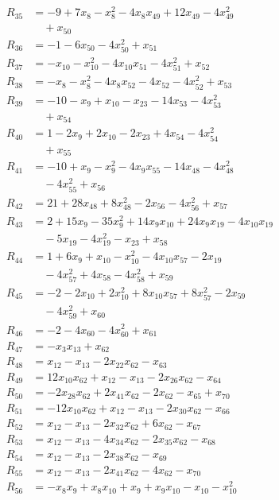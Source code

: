 \begin{align*}
R_{35}&=-9+7x_{8}-x_{8}^{2}-4x_{8}x_{49}+12x_{49}-4x_{49}^{2}\\
&\quad{}+x_{50}\\
R_{36}&=-1-6x_{50}-4x_{50}^{2}+x_{51}\\
R_{37}&=-x_{10}-x_{10}^{2}-4x_{10}x_{51}-4x_{51}^{2}+x_{52}\\
R_{38}&=-x_{8}-x_{8}^{2}-4x_{8}x_{52}-4x_{52}-4x_{52}^{2}+x_{53}\\
R_{39}&=-10-x_{9}+x_{10}-x_{23}-14x_{53}-4x_{53}^{2}\\
&\quad{}+x_{54}\\
R_{40}&=1-2x_{9}+2x_{10}-2x_{23}+4x_{54}-4x_{54}^{2}\\
&\quad{}+x_{55}\\
R_{41}&=-10+x_{9}-x_{9}^{2}-4x_{9}x_{55}-14x_{48}-4x_{48}^{2}\\
&\quad{}-4x_{55}^{2}+x_{56}\\
R_{42}&=21+28x_{48}+8x_{48}^{2}-2x_{56}-4x_{56}^{2}+x_{57}\\
R_{43}&=2+15x_{9}-35x_{9}^{2}+14x_{9}x_{10}+24x_{9}x_{19}-4x_{10}x_{19}\\
&\quad{}-5x_{19}-4x_{19}^{2}-x_{23}+x_{58}\\
R_{44}&=1+6x_{9}+x_{10}-x_{10}^{2}-4x_{10}x_{57}-2x_{19}\\
&\quad{}-4x_{57}^{2}+4x_{58}-4x_{58}^{2}+x_{59}\\
R_{45}&=-2-2x_{10}+2x_{10}^{2}+8x_{10}x_{57}+8x_{57}^{2}-2x_{59}\\
&\quad{}-4x_{59}^{2}+x_{60}\\
R_{46}&=-2-4x_{60}-4x_{60}^{2}+x_{61}\\
R_{47}&=-x_{3}x_{13}+x_{62}\\
R_{48}&=x_{12}-x_{13}-2x_{22}x_{62}-x_{63}\\
R_{49}&=12x_{10}x_{62}+x_{12}-x_{13}-2x_{26}x_{62}-x_{64}\\
R_{50}&=-2x_{28}x_{62}+2x_{41}x_{62}-2x_{62}-x_{65}+x_{70}\\
R_{51}&=-12x_{10}x_{62}+x_{12}-x_{13}-2x_{30}x_{62}-x_{66}\\
R_{52}&=x_{12}-x_{13}-2x_{32}x_{62}+6x_{62}-x_{67}\\
R_{53}&=x_{12}-x_{13}-4x_{34}x_{62}-2x_{35}x_{62}-x_{68}\\
R_{54}&=x_{12}-x_{13}-2x_{38}x_{62}-x_{69}\\
R_{55}&=x_{12}-x_{13}-2x_{41}x_{62}-4x_{62}-x_{70}\\
R_{56}&=-x_{8}x_{9}+x_{8}x_{10}+x_{9}+x_{9}x_{10}-x_{10}-x_{10}^{2}\\

\end{align*}
